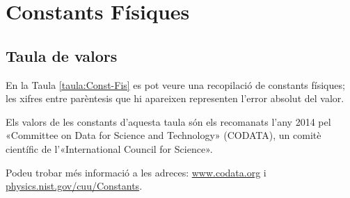 \chapter{Constants Físiques}\label{sec:const_fis} 

\section{Taula de valors}

En la Taula \vref{taula:Const-Fis} es pot veure una recopilació de
constants físiques; les xifres entre parèntesis que hi apareixen representen l'error absolut del valor.

Els valors de les constants d'aquesta taula són els recomanats
l'any 2014 pel «Committee on Data for Science and Technology»
(CODATA), un comitè científic de l'«International Council
for Science».

Podeu trobar  més informació a
les adreces: \href{http://www.codata.org/}{www.codata.org} i \href{http://physics.nist.gov/cuu/Constants/}{physics.nist.gov/cuu/Constants}.


